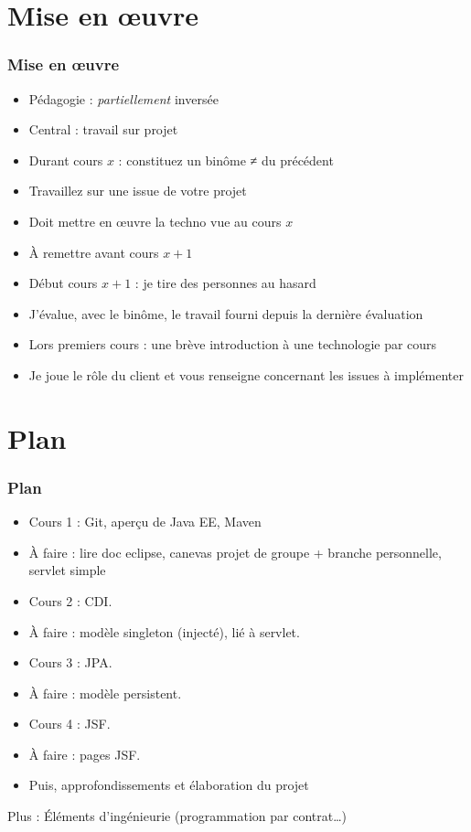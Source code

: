 \documentclass[english, french]{beamer}
\begin{document}
\section{Mise en œuvre}
\begin{frame}
	\frametitle{Mise en œuvre}
	\begin{itemize}
		\item Pédagogie : \emph{partiellement} inversée
		\item Central : travail sur projet
		\item Durant cours $x$ : constituez un binôme ≠ du précédent
		\item Travaillez sur une issue de votre projet
		\item Doit mettre en œuvre la techno vue au cours $x$
		\item À remettre avant cours $x + 1$
		\item Début cours $x + 1$ : je tire des personnes au hasard
		\item J’évalue, avec le binôme, le travail fourni depuis la dernière évaluation
		\item Lors premiers cours : une brève introduction à une technologie par cours
		\item Je joue le rôle du client et vous renseigne concernant les issues à implémenter
	\end{itemize}
\end{frame}

\section{Plan}
\begin{frame}
	\frametitle{Plan}
	
	\begin{itemize}
		\item Cours 1 : Git, aperçu de Java EE, Maven
		\item À faire : lire doc eclipse, canevas projet de groupe + branche personnelle, servlet simple
		\item Cours 2 : CDI.
		\item À faire : modèle singleton (injecté), lié à servlet.
		\item Cours 3 : JPA.
		\item À faire : modèle persistent.
		\item Cours 4 : JSF.
		\item À faire : pages JSF.
		\item Puis, approfondissements et élaboration du projet
	\end{itemize}
	Plus : Éléments d’ingénieurie (programmation par contrat…)
\end{frame}
\end{document}
